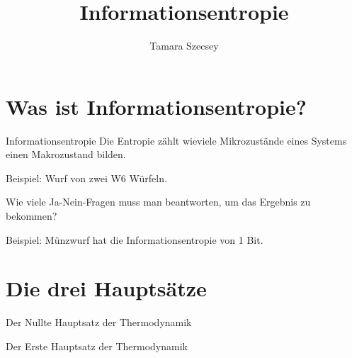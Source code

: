 \documentclass[screen, ngerman]{beamer}
\title{Informationsentropie}
\author{Tamara Szecsey}
\begin{document}
	\begin{frame}
		\maketitle
	\end{frame}
	
	\begin{frame}
		\tableofcontents
	\end{frame}
	
	\section{Was ist Informationsentropie?}
	\begin{frame}{Informationsentropie}
		Die Entropie zählt wieviele Mikrozustände eines Systems einen Makrozustand bilden. 
		
		Beispiel: Wurf von zwei W6 Würfeln. 
		
		Wie viele Ja-Nein-Fragen muss man beantworten, um das Ergebnis zu bekommen?
		
		Beispiel: Münzwurf hat die Informationsentropie von 1 Bit.
	\end{frame}
	
	\section{Die drei Hauptsätze}
	\begin{frame}{Der Nullte Hauptsatz der Thermodynamik}	
	\end{frame}
	
	\begin{frame}{Der Erste Hauptsatz der Thermodynamik}
	\end{frame}	
\end{document}
